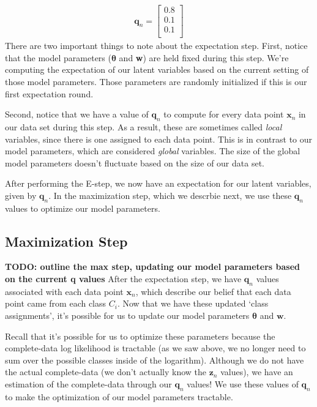 \begin{align*}
    \textbf{q}_n = \begin{bmatrix}
            0.8 \\
            0.1 \\
            0.1 \\
        \end{bmatrix}
\end{align*}
There are two important things to note about the expectation step. First, notice that the model parameters ($\boldsymbol{\theta}$ and \textbf{w}) are held fixed during this step. We're computing the expectation of our latent variables based on the current setting of those model parameters. Those parameters are randomly initialized if this is our first expectation round.

Second, notice that we have a value of $\textbf{q}_n$ to compute for every data point $\textbf{x}_n$ in our data set during this step. As a result, these are sometimes called \textit{local} variables, since there is one assigned to each data point. This is in contrast to our model parameters, which are considered \textit{global} variables. The size of the global model parameters doesn't fluctuate based on the size of our data set.

After performing the E-step, we now have an expectation for our latent variables, given by $\textbf{q}_n$. In the maximization step, which we descrbie next, we use these $\textbf{q}_n$ values to optimize our model parameters.

\subsection{Maximization Step}
\textbf{TODO: outline the max step, updating our model parameters based on the current q values}
After the expectation step, we have $\textbf{q}_n$ values associated with each data point $\textbf{x}_n$, which describe our belief that each data point came from each class $C_i$. Now that we have these updated `class assignments', it's possible for us to update our model parameters $\boldsymbol{\theta}$ and $\textbf{w}$.

Recall that it's possible for us to optimize these parameters because the complete-data log likelihood is tractable (as we saw above, we no longer need to sum over the possible classes inside of the logarithm). Although we do not have the actual complete-data (we don't actually know the $\textbf{z}_n$ values), we have an estimation of the complete-data through our $\textbf{q}_n$ values! We use these values of $\textbf{q}_n$ to make the optimization of our model parameters tractable.

